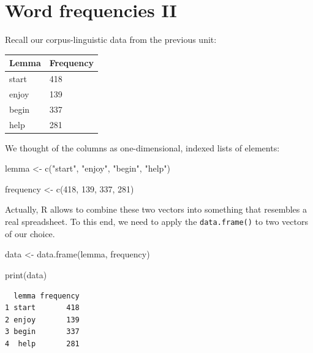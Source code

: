 \documentclass[
  11pt,
  letterpaper,
  DIV=11,
  numbers=noendperiod]{scrreprt}
\newenvironment{Shaded}{\begin{snugshade}}{\end{snugshade}}
\newcommand{\DecValTok}[1]{\textcolor[rgb]{0.68,0.00,0.00}{#1}}
\newcommand{\FunctionTok}[1]{\textcolor[rgb]{0.28,0.35,0.67}{#1}}
\newcommand{\NormalTok}[1]{\textcolor[rgb]{0.00,0.23,0.31}{#1}}
\newcommand{\OtherTok}[1]{\textcolor[rgb]{0.00,0.23,0.31}{#1}}
\newcommand{\StringTok}[1]{\textcolor[rgb]{0.13,0.47,0.30}{#1}}
\begin{document}
\section{Word frequencies II}\label{word-frequencies-ii}

Recall our corpus-linguistic data from the previous unit:

\begin{longtable}[]{@{}ll@{}}
\toprule\noalign{}
Lemma & Frequency \\
\midrule\noalign{}
\endhead
\bottomrule\noalign{}
\endlastfoot
start & 418 \\
enjoy & 139 \\
begin & 337 \\
help & 281 \\
\end{longtable}

We thought of the columns as one-dimensional, indexed lists of elements:

\begin{Shaded}
\begin{Highlighting}[]
\NormalTok{lemma }\OtherTok{\textless{}{-}} \FunctionTok{c}\NormalTok{(}\StringTok{"start"}\NormalTok{, }\StringTok{"enjoy"}\NormalTok{, }\StringTok{"begin"}\NormalTok{, }\StringTok{"help"}\NormalTok{)}

\NormalTok{frequency }\OtherTok{\textless{}{-}} \FunctionTok{c}\NormalTok{(}\DecValTok{418}\NormalTok{, }\DecValTok{139}\NormalTok{, }\DecValTok{337}\NormalTok{, }\DecValTok{281}\NormalTok{)}
\end{Highlighting}
\end{Shaded}

Actually, R allows to combine these two vectors into something that
resembles a real spreadsheet. To this end, we need to apply the
\texttt{data.frame()} to two vectors of our choice.

\begin{Shaded}
\begin{Highlighting}[]
\NormalTok{data }\OtherTok{\textless{}{-}} \FunctionTok{data.frame}\NormalTok{(lemma, frequency)}

\FunctionTok{print}\NormalTok{(data)}
\end{Highlighting}
\end{Shaded}

\begin{verbatim}
  lemma frequency
1 start       418
2 enjoy       139
3 begin       337
4  help       281
\end{verbatim}
\end{document}
